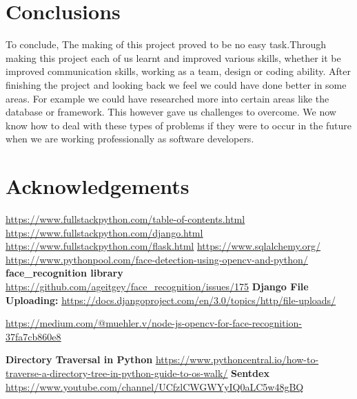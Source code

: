 \documentclass{article}
\begin{document}
\begin{flushleft}
\begin{flushleft}
\section{Conclusions}
To conclude, \newline
The making of this project proved to be no easy task.Through making this project each of us learnt and improved various skills, whether it be improved communication skills, working as a team, design or coding ability. After finishing the project and looking back we feel we could have done better in some areas. For example we could have researched more into certain areas like the database or framework. This however gave us challenges to overcome. We now know how to deal with these types of problems if they were to occur in the future when we are working professionally as software developers.

\section{Acknowledgements}

\underline{\url{https://www.fullstackpython.com/table-of-contents.html}}
\newline
\underline{\url{https://www.fullstackpython.com/django.html}}
\newline
\underline{\url{https://www.fullstackpython.com/flask.html}}
\newline
\underline{\url{https://www.sqlalchemy.org/}}
\newline
\underline{\url{https://www.pythonpool.com/face-detection-using-opencv-and-python/}}
\newline
\newline
\textbf{face\_recognition library}
\underline{\url{https://github.com/ageitgey/face\_recognition/issues/175}}
\newline
\newline
\textbf{Django File Uploading:}
\underline{\url{https://docs.djangoproject.com/en/3.0/topics/http/file-uploads/}}
\newline

\underline{\url{https://medium.com/@muehler.v/node-js-opencv-for-face-recognition-37fa7cb860e8}}
\newline

\textbf{Directory Traversal in Python}
\underline{\url{https://www.pythoncentral.io/how-to-traverse-a-directory-tree-in-python-guide-to-os-walk/}}
\newline
\newline
\textbf{Sentdex}
\newline
\underline{\url{https://www.youtube.com/channel/UCfzlCWGWYyIQ0aLC5w48gBQ}}
\end{flushleft}
\end{flushleft}
\end{document}
